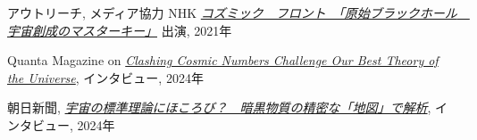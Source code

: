 \begin{rSection}{アウトリーチ, メディア協力}
  NHK \href{https://www.nhk-ondemand.jp/goods/G2021114366SA000/}{\textit{コズミック　フロント　「原始ブラックホール　宇宙創成のマスターキー」}} 出演, 2021年

  Quanta Magazine on \href{https://www.quantamagazine.org/clashing-cosmic-numbers-challenge-our-best-theory-of-the-universe-20240119/}{\textit{Clashing Cosmic Numbers Challenge Our Best Theory of the Universe}}, インタビュー, 2024年
  
  朝日新聞, \href{https://www.asahi.com/articles/ASR4H415RR48ULBH001.html}{\textit{宇宙の標準理論にほころび？　暗黒物質の精密な「地図」で解析}}, インタビュー, 2024年
\end{rSection}
